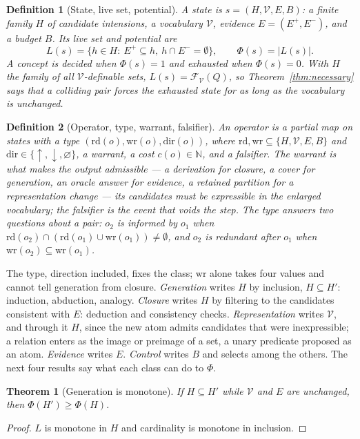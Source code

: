 \documentclass[11pt]{article}
\newtheorem{definition}{Definition}
\newtheorem{theorem}{Theorem}
\newcommand{\Vocab}{\mathcal{V}}
\newcommand{\Epos}{E^{+}}
\newcommand{\Eneg}{E^{-}}
\begin{document}
\begin{definition}[State, live set, potential]
A \emph{state} is $s=(H,\Vocab,E,B)$: a finite family $H$ of candidate intensions, a vocabulary
$\Vocab$, evidence $E=(\Epos,\Eneg)$, and a budget $B$. Its \emph{live set} and \emph{potential} are
\[
  L(s)=\{h\in H:\ \Epos\subseteq h,\ h\cap\Eneg=\emptyset\},
  \qquad \Phi(s)=|L(s)|.
\]
A concept is \emph{decided} when $\Phi(s)=1$ and \emph{exhausted} when $\Phi(s)=0$. With $H$ the
family of all $\Vocab$-definable sets, $L(s)=\mathcal{F}_{\Vocab}(Q)$, so
Theorem~\ref{thm:necessary} says that a colliding pair forces the exhausted state for as long as the
vocabulary is unchanged.
\end{definition}

\begin{definition}[Operator, type, warrant, falsifier]
An \emph{operator} is a partial map on states with a type
$(\mathrm{rd}(o),\mathrm{wr}(o),\mathrm{dir}(o))$, where $\mathrm{rd},\mathrm{wr}\subseteq
\{H,\Vocab,E,B\}$ and $\mathrm{dir}\in\{\uparrow,\downarrow,\varnothing\}$, a
\emph{warrant}, a cost $c(o)\in\mathbb{N}$, and a \emph{falsifier}. The warrant is what makes the
output admissible --- a derivation for closure, a cover for generation, an oracle answer for evidence,
a retained partition for a representation change --- its candidates must be expressible in
the enlarged vocabulary; the falsifier is the event that voids the step. The
type answers two questions about a pair: $o_2$ is \emph{informed} by $o_1$ when
$\mathrm{rd}(o_2)\cap(\mathrm{rd}(o_1)\cup\mathrm{wr}(o_1))\neq\emptyset$, and $o_2$ is
\emph{redundant after} $o_1$ when $\mathrm{wr}(o_2)\subseteq\mathrm{wr}(o_1)$.
\end{definition}

The type, direction included, fixes the class; $\mathrm{wr}$ alone takes four values and cannot tell
generation from closure. \emph{Generation} writes $H$ by inclusion, $H\subseteq H'$:
induction, abduction, analogy. \emph{Closure} writes $H$ by filtering to the candidates consistent
with $E$: deduction and consistency checks. \emph{Representation} writes $\Vocab$, and through it $H$,
since the new atom admits candidates that were inexpressible; a relation enters as the image or
preimage of a set, a unary predicate proposed as an atom. \emph{Evidence}
writes $E$. \emph{Control} writes $B$ and selects among the others. The next four results say what
each class can do to $\Phi$.

\begin{theorem}[Generation is monotone]\label{thm:gen}
If $H\subseteq H'$ while $\Vocab$ and $E$ are unchanged, then $\Phi(H')\ge\Phi(H)$.
\end{theorem}
\begin{proof}
$L$ is monotone in $H$ and cardinality is monotone in inclusion.
\end{proof}
\end{document}
